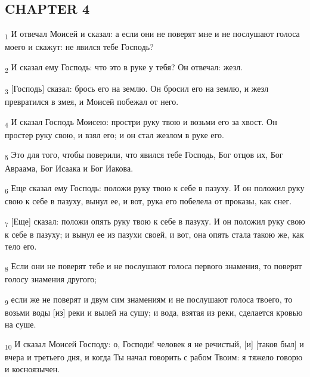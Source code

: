 \subsection{CHAPTER 4}
\begin{tcolorbox}
\textsubscript{1} И отвечал Моисей и сказал: а если они не поверят мне и не послушают голоса моего и скажут: не явился тебе Господь?
\end{tcolorbox}
\begin{tcolorbox}
\textsubscript{2} И сказал ему Господь: что это в руке у тебя? Он отвечал: жезл.
\end{tcolorbox}
\begin{tcolorbox}
\textsubscript{3} [Господь] сказал: брось его на землю. Он бросил его на землю, и жезл превратился в змея, и Моисей побежал от него.
\end{tcolorbox}
\begin{tcolorbox}
\textsubscript{4} И сказал Господь Моисею: простри руку твою и возьми его за хвост. Он простер руку свою, и взял его; и он стал жезлом в руке его.
\end{tcolorbox}
\begin{tcolorbox}
\textsubscript{5} Это для того, чтобы поверили, что явился тебе Господь, Бог отцов их, Бог Авраама, Бог Исаака и Бог Иакова.
\end{tcolorbox}
\begin{tcolorbox}
\textsubscript{6} Еще сказал ему Господь: положи руку твою к себе в пазуху. И он положил руку свою к себе в пазуху, вынул ее, и вот, рука его побелела от проказы, как снег.
\end{tcolorbox}
\begin{tcolorbox}
\textsubscript{7} [Еще] сказал: положи опять руку твою к себе в пазуху. И он положил руку свою к себе в пазуху; и вынул ее из пазухи своей, и вот, она опять стала такою же, как тело его.
\end{tcolorbox}
\begin{tcolorbox}
\textsubscript{8} Если они не поверят тебе и не послушают голоса первого знамения, то поверят голосу знамения другого;
\end{tcolorbox}
\begin{tcolorbox}
\textsubscript{9} если же не поверят и двум сим знамениям и не послушают голоса твоего, то возьми воды [из] реки и вылей на сушу; и вода, взятая из реки, сделается кровью на суше.
\end{tcolorbox}
\begin{tcolorbox}
\textsubscript{10} И сказал Моисей Господу: о, Господи! человек я не речистый, [и] [таков был] и вчера и третьего дня, и когда Ты начал говорить с рабом Твоим: я тяжело говорю и косноязычен.
\end{tcolorbox}

